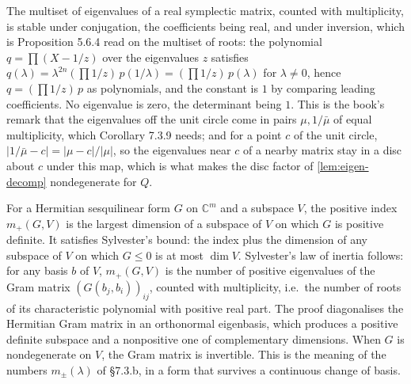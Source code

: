 \begin{lemma}
  \label{lem:symplectic-spectrum}
  \leanok
  The multiset of eigenvalues of a real symplectic matrix, counted with
  multiplicity, is stable under conjugation, the coefficients being real, and
  under inversion, which is Proposition 5.6.4 read on the multiset of roots: the
  polynomial $q = \prod (X - 1/z)$ over the eigenvalues $z$ satisfies
  $q(\lambda) = \lambda^{2n} (\prod 1/z)\, p(1/\lambda) = (\prod 1/z)\, p(\lambda)$
  for $\lambda \ne 0$, hence $q = (\prod 1/z)\, p$ as polynomials, and the
  constant is $1$ by comparing leading coefficients.  No eigenvalue is zero, the
  determinant being $1$.  This is the book's remark that the eigenvalues off the
  unit circle come in pairs $\mu, 1/\bar\mu$ of equal multiplicity, which
  Corollary 7.3.9 needs; and for a point $c$ of the unit circle,
  $\lvert 1/\bar\mu - c\rvert = \lvert \mu - c\rvert / \lvert\mu\rvert$, so the
  eigenvalues near $c$ of a nearby matrix stay in a disc about $c$ under this
  map, which is what makes the disc factor of \ref{lem:eigen-decomp}
  nondegenerate for $Q$.
\end{lemma}

\begin{lemma}
  \label{lem:hermitian-index}
  \leanok
  For a Hermitian sesquilinear form $G$ on $\mathbb{C}^m$ and a subspace $V$,
  the positive index $m_+(G, V)$ is the largest dimension of a subspace of $V$
  on which $G$ is positive definite.  It satisfies Sylvester's bound: the index
  plus the dimension of any subspace of $V$ on which $G \le 0$ is at most
  $\dim V$.  Sylvester's law of inertia follows: for any basis $b$ of $V$,
  $m_+(G, V)$ is the number of positive eigenvalues of the Gram matrix
  $(G(b_j, b_i))_{ij}$, counted with multiplicity, i.e.\ the number of roots
  of its characteristic polynomial with positive real part.  The proof
  diagonalises the Hermitian Gram matrix in an orthonormal eigenbasis, which
  produces a positive definite subspace and a nonpositive one of complementary
  dimensions.  When $G$ is nondegenerate on $V$, the Gram matrix is
  invertible.  This is the meaning of the numbers $m_\pm(\lambda)$ of \S7.3.b,
  in a form that survives a continuous change of basis.
\end{lemma}

